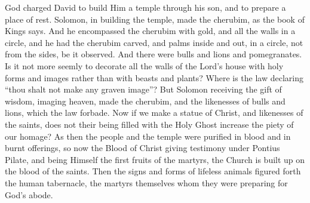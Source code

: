 \documentclass[10pt]{book}
\newcommand{\switchgreek}[1][]{\selectlanguage{polutonikogreek} \switchcolumn*[#1]}
\newcommand{\switchenglish}{\selectlanguage{english} \switchcolumn}
\begin{document}
\begin{paracol}{2}
\switchenglish

God charged David to build Him a temple 
through his son, and to prepare a place of rest. 
Solomon, in building the temple, made the 
cherubim, as the book of Kings says. And he 
encompassed the cherubim with gold, and all 
the walls in a circle, and he had the cherubim 
carved, and palms inside and out, in a circle, 
not from the sides, be it observed. And there 
were bulls and lions and pomegranates. Is it 
not more seemly to decorate all the walls of 
the Lord's house with holy forms and images 
rather than with beasts and plants? Where is 
the law declaring ``thou shalt not make any 
graven image''? But Solomon receiving the 
gift of wisdom, imaging heaven, made the 
cherubim, and the likenesses of bulls and lions, 
which the law forbade. Now if we make a 
statue of Christ, and likenesses of the saints, 
does not their being filled with the Holy Ghost 
increase the piety of our homage? As then 
the people and the temple were purified in 
blood and in burnt offerings, so now the Blood 
of Christ giving testimony under Pontius 
Pilate, and being Himself the first fruits of 
the martyrs, the Church is built up on the 
blood of the saints. Then the signs and 
forms of lifeless animals figured forth the 
human tabernacle, the martyrs themselves 
whom they were preparing for God's abode. 

\switchgreek


\end{paracol}
\end{document}

